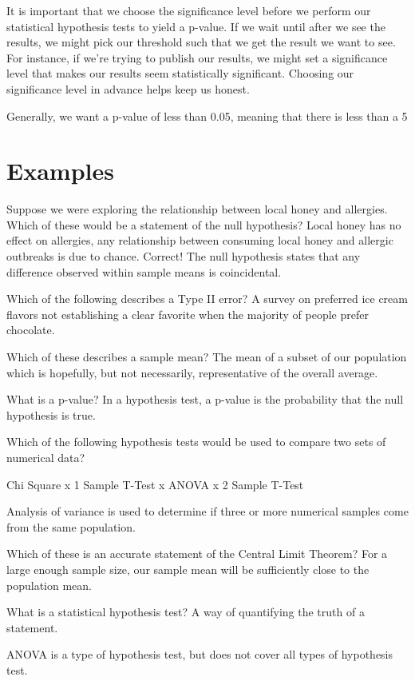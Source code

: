 \documentclass{journal}
\begin{document}
It is important that we choose the significance level before we perform our statistical hypothesis tests to yield a p-value. If we wait until after we see the results, we might pick our threshold such that we get the result we want to see. For instance, if we're trying to publish our results, we might set a significance level that makes our results seem statistically significant. Choosing our significance level in advance helps keep us honest.

Generally, we want a p-value of less than 0.05, meaning that there is less than a 5%

\section{Examples }
Suppose we were exploring the relationship between local honey and allergies. Which of these would be a statement of the null hypothesis? Local honey has no effect on allergies, any relationship between consuming local honey and allergic outbreaks is due to chance. Correct! The null hypothesis states that any difference observed within sample means is coincidental.

Which of the following describes a Type II error?
A survey on preferred ice cream flavors not establishing a clear favorite when the majority of people prefer chocolate.

Which of these describes a sample mean?
The mean of a subset of our population which is hopefully, but not necessarily, representative of the overall average.

What is a p-value?
In a hypothesis test, a p-value is the probability that the null hypothesis is true.

Which of the following hypothesis tests would be used to compare two sets of numerical data?

Chi Square x
1 Sample T-Test x
ANOVA x
2 Sample T-Test  

Analysis of variance is used to determine if three or more numerical samples come from the same population.


Which of these is an accurate statement of the Central Limit Theorem?
For a large enough sample size, our sample mean will be sufficiently close to the population mean.


What is a statistical hypothesis test?
A way of quantifying the truth of a statement.

ANOVA is a type of hypothesis test, but does not cover all types of hypothesis test.
\end{document}
